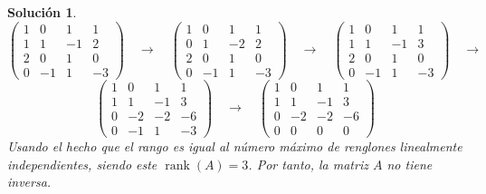 \documentclass[letterpaper]{article}
\DeclareMathOperator{\rank}{rank}
\newtheorem*{sol}{Solución}
\begin{document}
\begin{enumerate}
\begin{sol}
\[
    \begin{pmatrix}
        1 & 0  & 1  & 1\\ 
        1 & 1  & -1 & 2\\ 
        2 & 0  & 1  & 0\\ 
        0 & -1 & 1  & -3
    \end{pmatrix}
    \quad\longrightarrow\quad
    \begin{pmatrix}
        1 & 0  & 1  & 1\\ 
        0 & 1  & -2 & 2\\ 
        2 & 0  & 1  & 0\\
        0 & -1 & 1  & -3
    \end{pmatrix}
    \quad\longrightarrow\quad
    \begin{pmatrix}
        1 & 0  & 1  & 1\\ 
        1 & 1  & -1 & 3\\ 
        2 & 0  & 1  & 0\\ 
        0 & -1 & 1  & -3
    \end{pmatrix}
    \quad\longrightarrow\quad
\]
\[
    \begin{pmatrix}
        1 & 0  & 1  & 1\\ 
        1 & 1  & -1 & 3\\ 
        0 & -2 & -2 & -6\\ 
        0 & -1 & 1  & -3
    \end{pmatrix}
    \quad\longrightarrow\quad
    \begin{pmatrix}
        1 & 0  & 1  & 1\\ 
        1 & 1  & -1 & 3\\ 
        0 & -2 & -2 & -6\\ 
        0 & 0 & 0  & 0
    \end{pmatrix}
\]
Usando el hecho que el rango es igual al número máximo de renglones linealmente independientes, siendo este
$\rank(A) = 3$. Por tanto, la matriz $A$ no tiene inversa.
\end{sol}


\end{enumerate}
\end{document}
